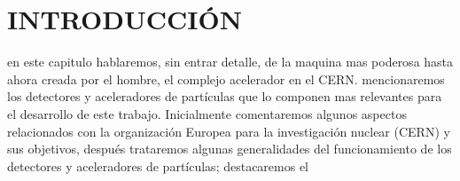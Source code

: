 \chapter*{INTRODUCCI\'ON}
en este capitulo hablaremos, sin entrar detalle, de la maquina mas poderosa hasta ahora 
creada por el hombre, el complejo acelerador en el CERN. mencionaremos los detectores y aceleradores 
de partículas que lo componen mas relevantes para el desarrollo de este trabajo. Inicialmente comentaremos  
algunos aspectos relacionados con la organizaci\'on Europea para la investigaci\'on nuclear (CERN) y sus objetivos,  
despu\'es trataremos algunas generalidades  del funcionamiento de los detectores  y aceleradores de part\'iculas; destacaremos el 

